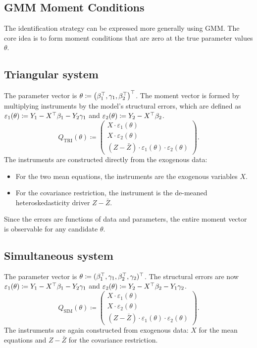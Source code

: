 \subsection{GMM Moment Conditions}

The identification strategy can be expressed more generally using
GMM. The core idea is to form moment conditions that are zero at the
true parameter values $\theta$.

\subsection{Triangular system}

The parameter vector is $\theta\coloneqq\bigl(\beta_{1}^{\top},\gamma_{1},\beta_{2}^{\top}\bigr)^{\top}$.
The moment vector is formed by multiplying instruments by the model's
structural errors, which are defined as $\varepsilon_{1}(\theta)\coloneqq Y_{1}-X^{\top}\beta_{1}-Y_{2}\gamma_{1}$
and $\varepsilon_{2}(\theta)\coloneqq Y_{2}-X^{\top}\beta_{2}$.
\begin{equation}
Q_{\text{TRI}}(\theta)\coloneqq\begin{pmatrix}X\cdot\varepsilon_{1}(\theta)\\[3pt]
X\cdot\varepsilon_{2}(\theta)\\[3pt]
(Z-\bar{Z})\cdot\varepsilon_{1}(\theta)\cdot\varepsilon_{2}(\theta)
\end{pmatrix}.\label{eq:moment_tri}
\end{equation}
The instruments are constructed directly from the exogenous data:
\begin{itemize}
\itemsep0pt
\item For the two mean equations, the instruments are the exogenous variables
$X$.
\item For the covariance restriction, the instrument is the de-meaned heteroskedasticity
driver $Z-\bar{Z}$.
\end{itemize}
Since the errors are functions of data and parameters, the entire
moment vector is observable for any candidate $\theta$.

\subsection{Simultaneous system}\label{subsec:sys}

The parameter vector is $\theta\coloneqq(\beta_{1}^{\top},\gamma_{1},\beta_{2}^{\top},\gamma_{2})^{\top}$.
The structural errors are now $\varepsilon_{1}(\theta)\coloneqq Y_{1}-X^{\top}\beta_{1}-Y_{2}\gamma_{1}$
and $\varepsilon_{2}(\theta)\coloneqq Y_{2}-X^{\top}\beta_{2}-Y_{1}\gamma_{2}$.
\begin{equation}
Q_{\text{SIM}}(\theta)\coloneqq\begin{pmatrix}X\cdot\varepsilon_{1}(\theta)\\[3pt]
X\cdot\varepsilon_{2}(\theta)\\[3pt]
(Z-\bar{Z})\cdot\varepsilon_{1}(\theta)\cdot\varepsilon_{2}(\theta)
\end{pmatrix}.\label{eq:moment_sim}
\end{equation}
The instruments are again constructed from exogenous data: $X$ for
the mean equations and $Z-\bar{Z}$ for the covariance restriction.

